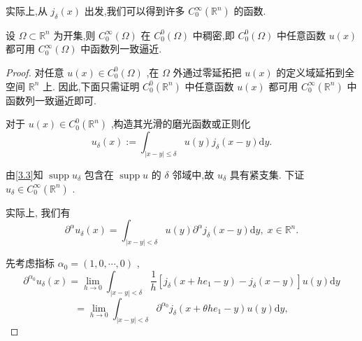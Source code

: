 \documentclass[lang=cn,newtx,10pt,scheme=chinese,thmcnt=chapter]{elegantbook}
\newcommand{\dif}{\mathrm{d}}
\begin{document}
实际上,从 \({j}_{\delta }\left( x\right)\) 出发,我们可以得到许多 \({C}_{0}^{\infty }\left( {\mathbb{R}}^{n}\right)\) 的函数.
\begin{theorem}
  设 \(\Omega  \subset  {\mathbb{R}}^{n}\) 为开集,则 \({C}_{0}^{\infty }\left( \Omega \right)\) 在 \({C}_{0}^{0}\left( \Omega \right)\) 中稠密,即 \({C}_{0}^{0}\left( \Omega \right)\) 中任意函数 \(u\left( x\right)\) 都可用 \({C}_{0}^{\infty }\left( \Omega \right)\) 中函数列一致逼近.

\end{theorem}
\begin{proof}
   对任意 \(u\left( x\right)  \in  {C}_{0}^{0}\left( \Omega \right)\) ,在 \(\Omega\) 外通过零延拓把 \(u\left( x\right)\) 的定义域延拓到全空间 \({\mathbb{R}}^{n}\) 上. 因此,下面只需证明 \({C}_{0}^{0}\left( {\mathbb{R}}^{n}\right)\) 中任意函数 \(u\left( x\right)\) 都可用 \({C}_{0}^{\infty }\left( {\mathbb{R}}^{n}\right)\) 中函数列一致逼近即可.

对于 \(u\left( x\right)  \in  {C}_{0}^{0}\left( {\mathbb{R}}^{n}\right)\) ,构造其光滑的磨光函数或正则化
\begin{equation}
  {u}_{\delta }\left( x\right)  \mathrel{\text{ := }} {\int }_{\left| {x - y}\right|  \leqslant  \delta }u\left( y\right) {j}_{\delta }\left( {x - y}\right) {\dif y}. \label{3.3}
\end{equation}

由\ref{3.3}知 \(\operatorname{supp}{u}_{\delta }\) 包含在 \(\operatorname{supp}u\) 的 \(\delta\) 邻域中,故 \({u}_{\delta }\) 具有紧支集. 下证 \({u}_{\delta } \in  {C}_{0}^{\infty }\left( {\mathbb{R}}^{n}\right)\) .

实际上, 我们有
\begin{equation}
  {\partial }^{\alpha }{u}_{\delta }\left( x\right)  = {\int }_{\left| {x - y}\right|  < \delta }u\left( y\right) {\partial }^{\alpha }{j}_{\delta }\left( {x - y}\right) {\dif y},\;x \in  {\mathbb{R}}^{n}. \label{3.4}
\end{equation}


先考虑指标 \({\alpha }_{0} = \left( {1,0,\cdots ,0}\right)\) ,
\begin{equation*}
{\partial }^{{\alpha }_{0}}{u}_{\delta }\left( x\right)  = \mathop{\lim }\limits_{{h \rightarrow  0}}{\int }_{\left| {x - y}\right|  < \delta }\frac{1}{h}\left\lbrack  {{j}_{\delta }\left( {x + h{e}_{1} - y}\right)  - {j}_{\delta }\left( {x - y}\right) }\right\rbrack  u\left( y\right) {\dif y}
\end{equation*}
\begin{equation*}
= \mathop{\lim }\limits_{{h \rightarrow  0}}{\int }_{\left| {x - y}\right|  < \delta }{\partial }^{{\alpha }_{0}}{j}_{\delta }\left( {x + {\theta h}{e}_{1} - y}\right) u\left( y\right) {\dif y},
\end{equation*}


\end{proof}
\end{document}
